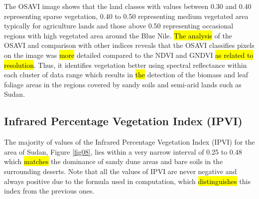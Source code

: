 \documentclass[jimaging,article,submit,pdftex,moreauthors]{Definitions/mdpi}
\begin{document}
The OSAVI image shows that the land classes with values between 0.30 and 0.40 representing sparse vegetation, 0.40 to 0.50 representing medium vegetated area typically for agriculture lands and those above 0.50 representing occasional regions with high vegetated area around the Blue Nile. \hl{The analysis }of the OSAVI and comparison with other indices reveals that the OSAVI classifies pixels on the image was \hl{more }detailed compared to the NDVI and GNDVI \hl{as related to resolution}. Thus, it identifies vegetation better using spectral reflectance within each cluster of data range which results in \hl{the }detection of the biomass and leaf foliage areas in the regions covered by sandy soils and semi-arid lands such as Sudan. 
\subsection{Infrared Percentage Vegetation Index (IPVI)}

The majority of values of the Infrared Percentage Vegetation Index (IPVI) for the area of Sudan, Figure \ref{fig08}, lies within a very narrow interval of 0.25 to 0.48 which \hl{matches }the dominance of sandy dune areas and bare soils in the surrounding deserts. Note that all the values of IPVI are never negative and always positive due to the formula used in computation, which \hl{distinguishes} this index from the previous ones.
\end{document}
